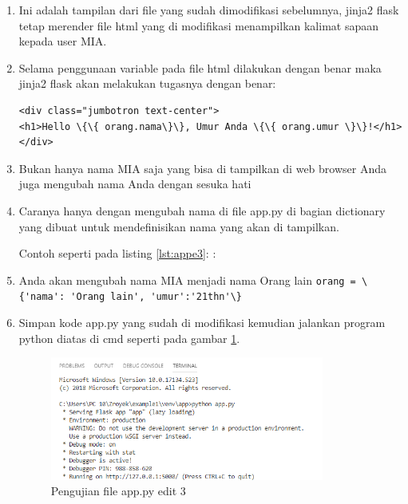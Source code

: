\begin{enumerate}
\item Ini adalah tampilan dari file yang sudah dimodifikasi sebelumnya, jinja2 flask tetap merender file html yang di modifikasi menampilkan kalimat sapaan kepada user MIA.
\item Selama penggunaan variable pada file html dilakukan dengan benar maka jinja2 flask akan melakukan tugasnya dengan benar:
\begin{verbatim}
<div class="jumbotron text-center">
<h1>Hello \{\{ orang.nama\}\}, Umur Anda \{\{ orang.umur \}\}!</h1>
</div>
\end{verbatim}

\item Bukan hanya nama MIA saja yang bisa di tampilkan di web browser  Anda juga mengubah nama  Anda dengan sesuka hati
\item Caranya hanya dengan mengubah nama di file app.py di bagian dictionary yang dibuat untuk mendefinisikan nama yang akan di tampilkan.

Contoh seperti pada listing \ref{lst:appe3}:
:

\item Anda akan mengubah nama MIA menjadi nama Orang lain 
\verb|orang = \{'nama': 'Orang lain', 'umur':'21thn'\}|
\item Simpan kode app.py yang sudah di modifikasi kemudian jalankan program python diatas di cmd seperti pada gambar \ref{fig:ufa3}.
\begin{figure}[!htbp]
	\centerline{\includegraphics[width=0.85\textwidth]{figures/13/ufa3.PNG}}
	\caption{Pengujian file app.py edit 3}
	\label{fig:ufa3}
\end{figure}


\end{enumerate}
